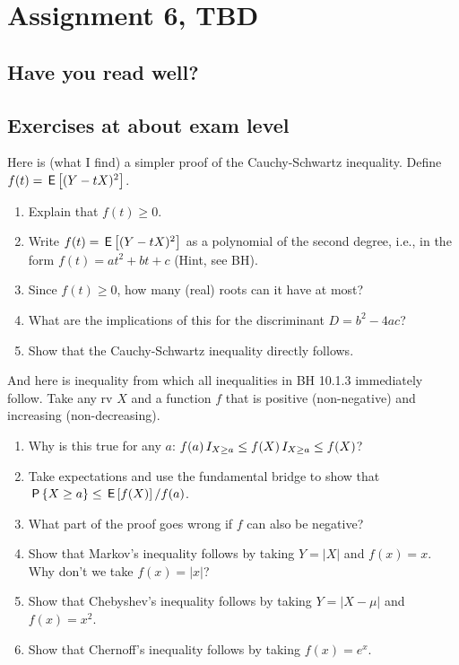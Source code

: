 \documentclass[assignments]{subfiles}
\begin{document}
\section{Assignment 6, TBD}


\subsection{Have you read well?}

\subsection{Exercises at about exam level}
\label{sec:exercises-at-about-1}



\begin{exercise}
Here is (what I find) a simpler proof of the Cauchy-Schwartz inequality.  Define  $f(t) = \,\mathsf{E}\left[(Y-tX)^2\right]$.
\begin{enumerate}
\item Explain that $f(t)\geq 0$.
\item Write $f(t) = \,\mathsf{E}\left[(Y-tX)^2\right]$ as a polynomial of the second degree, i.e., in the form $f(t) = a t^2 + b t + c$ (Hint, see BH).
\item Since $f(t) \geq 0$, how many (real) roots can it have at most?
\item What are the implications of this for the discriminant $D=b^2-4ac$?
\item Show that the Cauchy-Schwartz inequality directly follows.
\end{enumerate}
\end{exercise}

\begin{exercise}
And here is inequality from which all inequalities in BH 10.1.3 immediately follow.
Take any rv $X$ and a function $f$ that is positive (non-negative) and  increasing (non-decreasing).
\begin{enumerate}
\item Why is this true for any $a$: $f(a) \,I_{X\geq a} \leq f(X) \,I_{X\geq a} \leq f(X)$?
\item Take expectations and use the fundamental bridge to show that $\,\mathsf{P}\left\{X\geq a\right\} \leq \,\mathsf{E}\left[f(X)\right]/f(a)$.
\item What part of the proof goes wrong if  $f$ can also be negative?
\item Show that Markov's inequality follows by taking $Y=|X|$ and  $f(x)=x$. Why don't we take $f(x) = |x|$?
\item Show that Chebyshev's inequality follows by taking $Y=|X-\mu|$ and $f(x)=x^2$.
\item Show that Chernoff's inequality follows by taking $f(x)=e^{x}$.
\end{enumerate}
\end{exercise}
\end{document}
